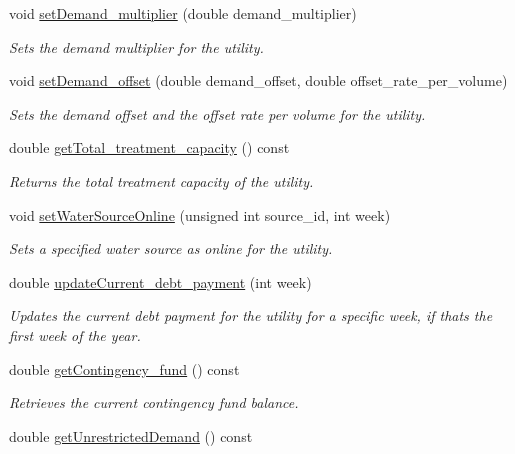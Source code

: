 \begin{DoxyCompactItemize}
void \mbox{\hyperlink{classUtility_ad562626bc39694622495d2fb2b68ecd4}{set\+Demand\+\_\+multiplier}} (double demand\+\_\+multiplier)
\begin{DoxyCompactList}\small\item\em Sets the demand multiplier for the utility. \end{DoxyCompactList}\item 
void \mbox{\hyperlink{classUtility_a6e7f1df1fcde0b14475c7045bdcaf218}{set\+Demand\+\_\+offset}} (double demand\+\_\+offset, double offset\+\_\+rate\+\_\+per\+\_\+volume)
\begin{DoxyCompactList}\small\item\em Sets the demand offset and the offset rate per volume for the utility. \end{DoxyCompactList}\item 
double \mbox{\hyperlink{classUtility_a6ab2e5b8aec47bcfed522c98ea1b5f79}{get\+Total\+\_\+treatment\+\_\+capacity}} () const
\begin{DoxyCompactList}\small\item\em Returns the total treatment capacity of the utility. \end{DoxyCompactList}\item 
void \mbox{\hyperlink{classUtility_ae01127adf3c99415310e77b22bd9f3b5}{set\+Water\+Source\+Online}} (unsigned int source\+\_\+id, int week)
\begin{DoxyCompactList}\small\item\em Sets a specified water source as online for the utility. \end{DoxyCompactList}\item 
double \mbox{\hyperlink{classUtility_a63f5ae95014d9e729a3de51f19540042}{update\+Current\+\_\+debt\+\_\+payment}} (int week)
\begin{DoxyCompactList}\small\item\em Updates the current debt payment for the utility for a specific week, if that\textquotesingle{}s the first week of the year. \end{DoxyCompactList}\item 
double \mbox{\hyperlink{classUtility_ab396bc312d5e5ddc0554138060a8a4d3}{get\+Contingency\+\_\+fund}} () const
\begin{DoxyCompactList}\small\item\em Retrieves the current contingency fund balance. \end{DoxyCompactList}\item 
double \mbox{\hyperlink{classUtility_aa5fd345867aa8fb5c49d05110d51ca52}{get\+Unrestricted\+Demand}} () const

\end{DoxyCompactItemize}
